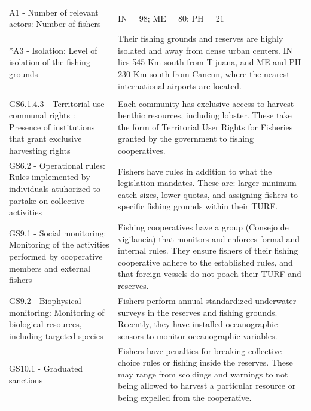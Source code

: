 \documentclass{frontiersSCNS}
\begin{document}
\begin{table}[H]
{\begin{tabular}{>{\raggedright\arraybackslash}p{6.5cm}|>{\raggedright\arraybackslash}p{12.2cm}}
\hline
\multicolumn{2}{l}{\textbf{Actors (A)}}\\
\hline
\hspace{1em}A1 - Number of relevant actors: Number of fishers & IN = 98; ME = 80; PH = 21\\
\hline
\hspace{1em}*A3 - Isolation: Level of isolation of the fishing grounds & Their fishing grounds and reserves are highly isolated and away from dense urban centers. IN lies 545 Km south from Tijuana, and ME and PH 230 Km south from Cancun, where the nearest international airports are located.\\
\hline
\multicolumn{2}{l}{\textbf{Governance system (G)}}\\
\hline
\hspace{1em}GS6.1.4.3 - Territorial use communal rights : Presence of institutions that grant exclusive harvesting rights & Each community has exclusive access to harvest benthic resources, including lobster. These take the form of Territorial User Rights for Fisheries granted by the government to fishing cooperatives.\\
\hline
\hspace{1em}GS6.2 - Operational rules: Rules implemented by individuals atuhorized to partake on collective activities & Fishers have rules in addition to what the legislation mandates. These are: larger minimum catch sizes, lower quotas, and assigning fishers to specific fishing grounds within their TURF.\\
\hline
\hspace{1em}GS9.1 - Social monitoring: Monitoring of the activities performed by cooperative members and external fishers & Fishing cooperatives have a group (Consejo de vigilancia) that monitors and enforces formal and internal rules. They ensure fishers of their fishing cooperative adhere to the established rules, and that foreign vessels do not poach their TURF and reserves.\\
\hline
\hspace{1em}GS9.2 - Biophysical monitoring: Monitoring of biological resources, including targeted species & Fishers perform annual standardized underwater surveys in the reserves and fishing grounds. Recently, they have installed oceanographic sensors to monitor oceanographic variables.\\
\hline
GS10.1 - Graduated sanctions & Fishers have penalties for breaking collective-choice rules or fishing inside the reserves. These may range from scoldings and warnings to not being allowed to harvest a particular resource or being expelled from the cooperative.\\
\hline
\end{tabular}}
\end{table}
\end{document}
